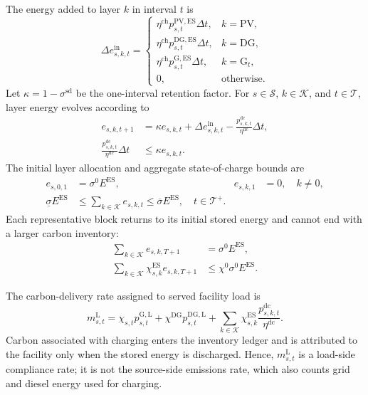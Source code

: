\documentclass[times]{elsarticle}
\begin{document}
The energy added to layer $k$ in interval $t$ is
\begin{equation}
\Delta e^{\mathrm{in}}_{s,k,t}=
\begin{cases}
\eta^{\mathrm{ch}}p^{\mathrm{PV},\mathrm{ES}}_{s,t}\Delta t,
&k=\mathrm{PV},\\
\eta^{\mathrm{ch}}p^{\mathrm{DG},\mathrm{ES}}_{s,t}\Delta t,
&k=\mathrm{DG},\\
\eta^{\mathrm{ch}}p^{\mathrm{G},\mathrm{ES}}_{s,t}\Delta t,
&k=\mathrm{G}_t,\\
0,&\text{otherwise}.
\end{cases}
\label{eq:additions}
\end{equation}
Let $\kappa=1-\sigma^{\mathrm{sd}}$ be the one-interval retention factor. For
$s\in\mathcal S$, $k\in\mathcal K$, and $t\in\mathcal T$, layer energy evolves
according to
\begin{align}
e_{s,k,t+1}&=\kappa e_{s,k,t}+\Delta e^{\mathrm{in}}_{s,k,t}
-\frac{p^{\mathrm{dc}}_{s,k,t}}{\eta^{\mathrm{dc}}}\Delta t,
\label{eq:layer_energy}\\
\frac{p^{\mathrm{dc}}_{s,k,t}}{\eta^{\mathrm{dc}}}\Delta t
&\le\kappa e_{s,k,t}.
\label{eq:available_energy}
\end{align}
The initial layer allocation and aggregate state-of-charge bounds are
\begin{align}
e_{s,0,1}&=\sigma^0E^{\mathrm{ES}},
&e_{s,k,1}&=0,\quad k\ne0,
\label{eq:initial_layers}\\
\underline\sigma E^{\mathrm{ES}}
&\le\sum_{k\in\mathcal K}e_{s,k,t}\le\overline\sigma E^{\mathrm{ES}},
\quad t\in\mathcal T^+.
\label{eq:soc}
\end{align}
Each representative block returns to its initial stored energy and cannot end
with a larger carbon inventory:
\begin{align}
\sum_{k\in\mathcal K}e_{s,k,T+1}&=\sigma^0E^{\mathrm{ES}},
\label{eq:terminal_energy}\\
\sum_{k\in\mathcal K}\chi^{\mathrm{ES}}_{s,k}e_{s,k,T+1}
&\le \chi^0\sigma^0E^{\mathrm{ES}}.
\label{eq:terminal_carbon}
\end{align}

The carbon-delivery rate assigned to served facility load is
\begin{equation}
m^{\mathrm L}_{s,t}=\chi_{s,t}p^{\mathrm{G},\mathrm L}_{s,t}
+\chi^{\mathrm{DG}}p^{\mathrm{DG},\mathrm L}_{s,t}
+\sum_{k\in\mathcal K}\chi^{\mathrm{ES}}_{s,k}
\frac{p^{\mathrm{dc}}_{s,k,t}}{\eta^{\mathrm{dc}}}.
\label{eq:delivered_carbon}
\end{equation}
Carbon associated with charging enters the inventory ledger and is attributed
to the facility only when the stored energy is discharged. Hence,
$m^{\mathrm L}_{s,t}$ is a load-side compliance rate; it is not the source-side emissions
rate, which also counts grid and diesel energy used for charging.
\end{document}
